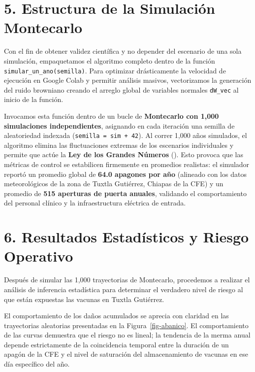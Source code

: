 \documentclass[
  spanish,
  letterpaper,
  DIV=11,
  numbers=noendperiod]{scrreprt}
\theoremstyle{plain}
\theoremstyle{definition}
\theoremstyle{remark}
\begin{document}
\section{5. Estructura de la Simulación
Montecarlo}\label{estructura-de-la-simulaciuxf3n-montecarlo}

Con el fin de obtener validez científica y no depender del escenario de
una sola simulación, empaquetamos el algoritmo completo dentro de la
función \texttt{simular\_un\_ano(semilla)}. Para optimizar drásticamente
la velocidad de ejecución en Google Colab y permitir análisis masivos,
vectorizamos la generación del ruido browniano creando el arreglo global
de variables normales \texttt{dW\_vec} al inicio de la función.

Invocamos esta función dentro de un bucle de \textbf{Montecarlo con
1,000 simulaciones independientes}, asignando en cada iteración una
semilla de aleatoriedad indexada (\texttt{semilla\ =\ sim\ +\ 42}). Al
correr 1,000 años simulados, el algoritmo elimina las fluctuaciones
extremas de los escenarios individuales y permite que actúe la
\textbf{Ley de los Grandes Números} (). Esto provoca que las métricas de control se estabilicen
firmemente en promedios realistas: el simulador reportó un promedio
global de \textbf{64.0 apagones por año} (alineado con los datos
meteorológicos de la zona de Tuxtla Gutiérrez, Chiapas de la CFE) y un
promedio de \textbf{515 aperturas de puerta anuales}, validando el
comportamiento del personal clínico y la infraestructura eléctrica de
entrada.

\section{6. Resultados Estadísticos y Riesgo
Operativo}\label{resultados-estaduxedsticos-y-riesgo-operativo}

Después de simular las 1,000 trayectorias de Montecarlo, procedemos a
realizar el análisis de inferencia estadística para determinar el
verdadero nivel de riesgo al que están expuestas las vacunas en Tuxtla
Gutiérrez.

El comportamiento de los daños acumulados se aprecia con claridad en las
trayectorias aleatorias presentadas en la Figura~\ref{fig-abanico}. El
comportamiento de las curvas demuestra que el riesgo no es lineal; la
tendencia de la merma anual depende estrictamente de la coincidencia
temporal entre la duración de un apagón de la CFE y el nivel de
saturación del almacenamiento de vacunas en ese día específico del año.
\end{document}

